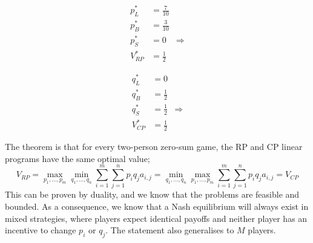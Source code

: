 \documentclass[a4paper, 12pt]{article}
\newcommand{\summation}[2]{\sum\limits_{#1}^{#2}}
\begin{document}
                \begin{center}
                    \vspace{-\baselineskip}
                    \hfill
                    \begin{minipage}[t]{0.4\textwidth}
                        \begin{align*}
                            p^*_L & = \frac{7}{10} \\
                            p^*_B & = \frac{3}{10} \\
                            p^*_S & = 0 & \Rightarrow \\
                            V^*_{RP} & = \frac{1}{2}
                        \end{align*}
                    \end{minipage}
                    \hfill
                    \begin{minipage}[t]{0.4\textwidth}
                        \begin{align*}
                            q^*_L & = 0 \\
                            q^*_B & = \frac{1}{2} \\
                            q^*_S & = \frac{1}{2} & \Rightarrow \\
                            V^*_{CP} & = \frac{1}{2}
                        \end{align*}
                    \end{minipage}
                    \hfill \phantom{}
                \end{center}
                The theorem is that for every two-person zero-sum game, the RP and CP linear programs have the same optimal value;
                $$V_{RP} = \max_{p_1, \dots, p_m} \min_{q_1, \dots, q_n} \summation{i = 1}{m} \summation{j = 1}{n} p_i q_j a_{i, j} = \min_{q_1, \dots, q_n} \max_{p_1, \dots, p_m} \summation{i = 1}{m} \summation{j = 1}{n} p_i q_j a_{i, j} = V_{CP}$$
                This can be proven by duality, and we know that the problems are feasible and bounded.
                As a consequence, we know that a Nash equilibrium will always exist in mixed strategies, where players expect identical payoffs and neither player has an incentive to change $p_i$ or $q_j$.
                The statement also generalises to $M$ players.
\end{document}
